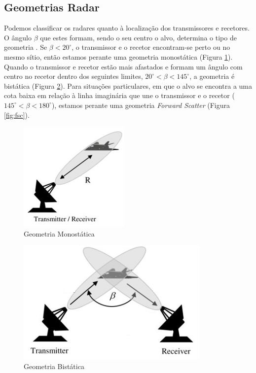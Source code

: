\subsection{Geometrias Radar}
Podemos classificar os radares quanto à localização dos transmissores e recetores. O ângulo $\beta$ que estes formam, sendo o seu centro o alvo, determina o tipo de geometria \parencite{Baker2019}. Se $\beta <20^{\circ}$, o transmissor e o recetor encontram-se perto ou no mesmo sítio, então estamos perante uma geometria monostática (Figura \ref{fig:monostatic}). Quando o transmissor e recetor estão mais afastados e formam um ângulo com centro no recetor dentro dos seguintes limites, $20^{\circ}<\beta <145^{\circ}$, a geometria é bistática (Figura \ref{fig:bistatic}). Para situações particulares, em que o alvo se encontra a uma cota baixa em relação à linha imaginária que une o transmissor e o recetor ($145^{\circ}<\beta <180^{\circ}$), estamos perante uma geometria \textit{Forward Scatter} (Figura \ref{fig:fsc}).\par   

\begin{figure}[h]
\centering
\includegraphics[scale=0.8]{chapters/ch2/assets/monostatic}
\caption[Geometria Monostática]{Geometria Monostática}
\label{fig:monostatic}
\end{figure}

\begin{figure}[h]
\centering
\includegraphics[scale=0.8]{chapters/ch2/assets/bistatic}
\caption[Geometria Bistática]{Geometria Bistática}
\label{fig:bistatic}
\end{figure}

